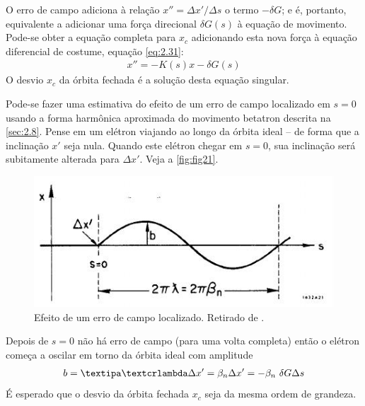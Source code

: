 O erro de campo adiciona à relação $x'' = \Delta x'/ \Delta s$ o termo $-\delta G$; e é, portanto, equivalente a adicionar uma força direcional $\delta G(s)$ à equação de movimento. Pode-se obter a equação completa para $x_c$ adicionando esta nova força à equação diferencial de costume, equação \eqref{eq:2.31}:
\begin{align}
	x'' = -K(s)x - \delta G(s)\label{eq:2.85}
\end{align}
O desvio $x_c$ da órbita fechada é a solução desta equação singular.

Pode-se fazer uma estimativa do efeito de um erro de campo localizado em $s=0$ usando a forma harmônica aproximada do movimento betatron descrita na \autoref{sec:2.8}. Pense em um elétron viajando ao longo da órbita ideal -- de forma que a inclinação $x'$ seja nula. Quando este elétron chegar em $s=0$, sua inclinação será subitamente alterada para $\Delta x'$. Veja a \autoref{fig:fig21}. 

\begin{figure}[!htb]
	\centering
	\includegraphics[width=0.7\linewidth]{./Figuras/fig21.jpeg}
	\caption{Efeito de um erro de campo localizado. Retirado de \cite{sands1970physics}.}
	\label{fig:fig21}
\end{figure}
Depois de $s=0$ não há erro de campo (para uma volta completa) então o elétron começa a oscilar em torno da órbita ideal com amplitude
\begin{align}
	b = \lambdabar \Delta x' = \beta_n \Delta x' = -\beta_n\ \delta G \Delta s\label{eq:2.86}
\end{align}
É esperado que o desvio da órbita fechada $x_c$ seja da mesma ordem de grandeza.


